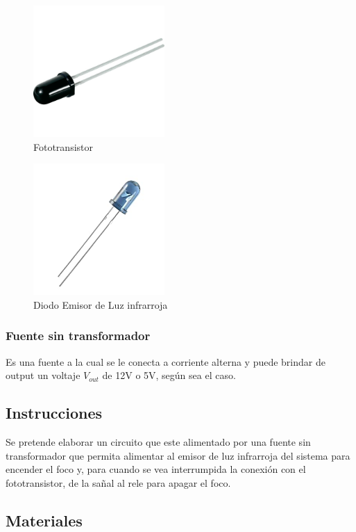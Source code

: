 \begin{figure}[htb]
    \centering
    \includegraphics[width=5cm]{media/Fototransistor.jpg}
    \caption{Fototransistor}
\end{figure}

\begin{figure}[htb]
    \centering
    \includegraphics[width=5cm]{media/emisor.jpg}
    \caption{Diodo Emisor de Luz infrarroja}
\end{figure}

\subsubsection{Fuente sin transformador}

Es una fuente a la cual se le conecta a corriente alterna y puede brindar de output un voltaje $V_{out}$ de 12V o 5V, según sea el caso.

\subsection{Instrucciones}

Se pretende elaborar un circuito que este alimentado por una fuente sin transformador que permita alimentar al emisor de luz infrarroja del sistema para encender el foco y,
para cuando se vea interrumpida la conexión con el fototransistor, de la sañal al rele para apagar el foco.

\subsection{Materiales}

